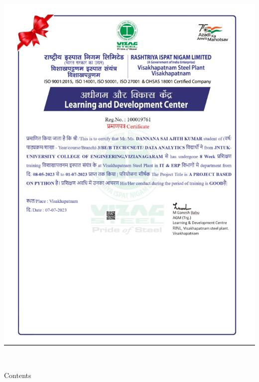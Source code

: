 \documentclass{article} %
\begin{document}
\noindent \includegraphics*[width=5.73in, height=7.77in]{image2}

\noindent \eject 

\noindent 

\noindent Contents
\end{document}
